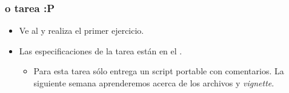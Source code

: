 \begin{frame}[allowframebreaks]
  \frametitle{o tarea :P}
  \begin{itemize}
  \item Ve al  y realiza el primer ejercicio.
  \item Las especificaciones de la tarea est\'an en el . 
  \begin{itemize}
    \item Para esta tarea s\'olo entrega un script portable  con comentarios. La siguiente semana aprenderemos acerca de los archivos  y \emph{vignette}.
  \end{itemize}
  \end{itemize}
\end{frame}



